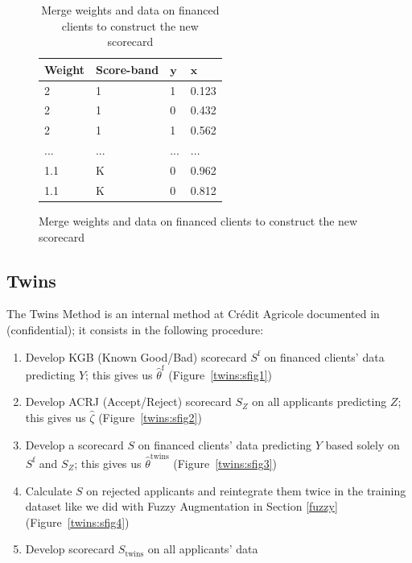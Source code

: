 \begin{table}
{\begin{multicols}{3}
\columnbreak

\begin{subfigure}[t]{0.31\textwidth}
\begin{center}
\begin{adjustbox}{max width=0.95\textwidth}

\begin{tabular}{l l l l}
\toprule
\textbf{Weight} & \textbf{Score-band} & \textbf{${\bm{y}}$} & \textbf{${\bm{x}}$}\\
\midrule
2 & 1 & 1 & 0.123 \\
2 & 1 & 0 & 0.432 \\
2 & 1 & 1 & 0.562 \\
... & ... & ... & ... \\
1.1 & K & 0 & 0.962 \\
1.1 & K & 0 & 0.812 \\
\bottomrule
\end{tabular}
\end{adjustbox}
\end{center}

\caption{Merge weights and data on financed clients to construct the new scorecard}
\label{augment:sfig3}
\end{subfigure}
\end{multicols}
}
\end{table}

\subsection{Twins} \label{Twins}

The Twins Method is an internal method at Crédit Agricole documented in~\cite{groupe} (confidential); it consists in the following procedure:
\begin{enumerate}
\item Develop KGB (Known Good/Bad) scorecard $S^{\text{f}}$ on financed clients' data predicting $Y$; this gives us $\hat{\theta}^{\text{f}}$ (Figure~\ref{twins:sfig1})
\item Develop ACRJ (Accept/Reject) scorecard $S_Z$ on all applicants predicting $Z$; this gives us $\hat{\zeta}$ (Figure~\ref{twins:sfig2})
\item Develop a scorecard $S$ on financed clients' data predicting $Y$ based solely on $S^{\text{f}}$ and $S_Z$; this gives us $\hat{\theta}^{\text{twins}}$ (Figure~\ref{twins:sfig3})
\item Calculate $S$ on rejected applicants and reintegrate them twice in the training dataset like we did with Fuzzy Augmentation in Section \ref{fuzzy} (Figure~\ref{twins:sfig4})
\item Develop scorecard $S_{\text{twins}}$ on all applicants' data
\end{enumerate}

